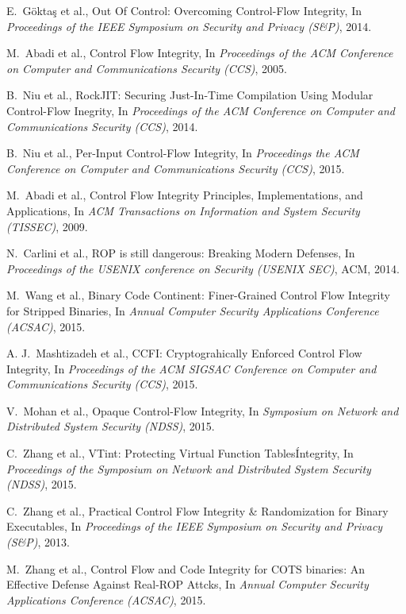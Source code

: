 \documentclass[11pt,a4paper,bibtotoc,idxtotoc,headsepline,footsepline,footexclude,BCOR12mm,DIV13]{scrbook}
\begin{document}
\begin{thebibliography}{50}
E.~G\"{o}kta\c{s} et al., {Out Of Control: Overcoming Control-Flow Integrity}, In
\emph{Proceedings of the IEEE Symposium on Security and Privacy (S\&P)}, 2014.

M.~Abadi et al., {Control Flow Integrity}, In
\emph{Proceedings of the ACM Conference on Computer and Communications Security (CCS)}, 2005.

B.~Niu et al., {RockJIT: Securing Just-In-Time Compilation Using Modular Control-Flow Inegrity}, In
\emph{Proceedings of the ACM Conference on Computer and Communications Security (CCS)}, 2014.

B.~Niu et al., {Per-Input Control-Flow Integrity}, In
\emph{Proceedings the ACM Conference on Computer and Communications Security (CCS)}, 2015.

M.~Abadi et al., {Control Flow Integrity Principles, Implementations, and Applications}, In
\emph{ACM Transactions on Information and System Security (TISSEC)}, 2009.

N.~Carlini et al., {ROP is still dangerous: Breaking Modern Defenses}, In
\emph{Proceedings of the USENIX conference on Security (USENIX SEC)}, ACM, 2014.

M.~Wang et al., {Binary Code Continent: Finer-Grained Control Flow Integrity for Stripped Binaries}, In
\emph{Annual Computer Security Applications Conference (ACSAC)}, 2015.

A. J.~Mashtizadeh et al., {CCFI: Cryptograhically Enforced Control Flow Integrity}, In
\emph{Proceedings of the ACM SIGSAC Conference on Computer and Communications Security (CCS)}, 2015.

V.~Mohan et al., {Opaque Control-Flow Integrity}, In
\emph{Symposium on Network and Distributed System Security (NDSS)}, 2015.

C.~Zhang et al., {VTint: Protecting Virtual Function Tables\' Integrity}, In
\emph{Proceedings of the Symposium on Network and Distributed System Security (NDSS)}, 2015.

C.~Zhang et al., {Practical Control Flow Integrity \& Randomization for Binary Executables}, In
\emph{Proceedings of the IEEE Symposium on Security and Privacy (S\&P)}, 2013.

M.~Zhang et al., {Control Flow and Code Integrity for COTS binaries: An Effective Defense Against Real-ROP Attcks}, In
\emph{Annual Computer Security Applications Conference (ACSAC)}, 2015.


\end{thebibliography}
\end{document}
